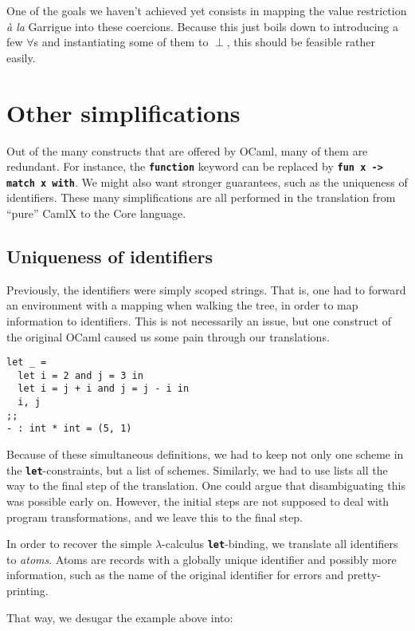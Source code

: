 \documentclass[10pt,a4paper,twoside,titlepage,twocolumn]{article}
\newcommand{\code}[1]{\textbf{\texttt{#1}}}
\begin{document}
One of the goals we haven't achieved yet consists in mapping the value
restriction \emph{à la} Garrigue into these coercions. Because this just boils
down to introducing a few $\forall$s and instantiating some of them to $\perp$,
this should be feasible rather easily.

\section{Other simplifications\label{desugar}}

Out of the many constructs that are offered by OCaml, many of them are
redundant. For instance, the \code{function} keyword can be replaced by
\code{fun x -> match x with}. We might also want stronger guarantees, such as
the uniqueness of identifiers. These many simplifications are all performed in the
translation from ``pure'' CamlX to the Core language.

\subsection{Uniqueness of identifiers}

Previously, the identifiers were simply scoped strings. That is, one had to
forward an environment with a mapping when walking the tree, in order to map
information to identifiers. This is not necessarily an issue, but one construct
of the original OCaml caused us some pain through our translations.

\begin{verbatim}
let _ =
  let i = 2 and j = 3 in
  let i = j + i and j = j - i in
  i, j
;;
- : int * int = (5, 1)
\end{verbatim}

Because of these simultaneous definitions, we had to keep not only one scheme in
the \code{let}-constraints, but a list of schemes. Similarly, we had to use
lists all the way to the final step of the translation. One could argue that
disambiguating this was possible early on. However, the initial steps are not
supposed to deal with program transformations, and we leave this to the final
step.

In order to recover the simple $\lambda$-calculus \code{let}-binding, we
translate all identifiers to \emph{atoms}. Atoms are records with a globally
unique identifier and possibly more information, such as the name of the
original identifier for errors and pretty-printing.

That way, we desugar the example above into:
\end{document}
